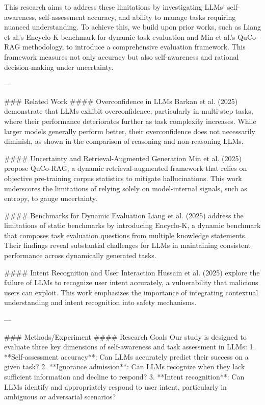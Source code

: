 This research aims to address these limitations by investigating LLMs' self-awareness, self-assessment accuracy, and ability to manage tasks requiring nuanced understanding. To achieve this, we build upon prior works, such as Liang et al.'s Encyclo-K benchmark for dynamic task evaluation and Min et al.'s QuCo-RAG methodology, to introduce a comprehensive evaluation framework. This framework measures not only accuracy but also self-awareness and rational decision-making under uncertainty.

---

### Related Work  
#### Overconfidence in LLMs  
Barkan et al. (2025) demonstrate that LLMs exhibit overconfidence, particularly in multi-step tasks, where their performance deteriorates further as task complexity increases. While larger models generally perform better, their overconfidence does not necessarily diminish, as shown in the comparison of reasoning and non-reasoning LLMs.

#### Uncertainty and Retrieval-Augmented Generation  
Min et al. (2025) propose QuCo-RAG, a dynamic retrieval-augmented framework that relies on objective pre-training corpus statistics to mitigate hallucinations. This work underscores the limitations of relying solely on model-internal signals, such as entropy, to gauge uncertainty.

#### Benchmarks for Dynamic Evaluation  
Liang et al. (2025) address the limitations of static benchmarks by introducing Encyclo-K, a dynamic benchmark that composes task evaluation questions from multiple knowledge statements. Their findings reveal substantial challenges for LLMs in maintaining consistent performance across dynamically generated tasks.

#### Intent Recognition and User Interaction  
Hussain et al. (2025) explore the failure of LLMs to recognize user intent accurately, a vulnerability that malicious users can exploit. This work emphasizes the importance of integrating contextual understanding and intent recognition into safety mechanisms.

---

### Methods/Experiment  
#### Research Goals  
Our study is designed to evaluate three key dimensions of self-awareness and task assessment in LLMs:  
1. **Self-assessment accuracy**: Can LLMs accurately predict their success on a given task?  
2. **Ignorance admission**: Can LLMs recognize when they lack sufficient information and decline to respond?  
3. **Intent recognition**: Can LLMs identify and appropriately respond to user intent, particularly in ambiguous or adversarial scenarios?  

